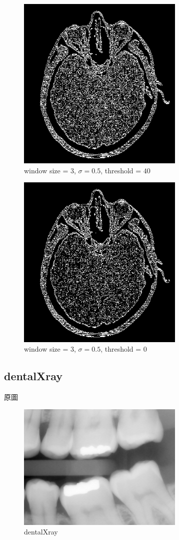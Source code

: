 \documentclass[conference]{IEEEtran}
\begin{document}
\begin{figure}[H]
\centerline{\includegraphics[width=8cm]{headCT13.png}}
\caption{window size = $3$, $\sigma=0.5$,  threshold = $40$}
\label{headCT13}
\end{figure}

\begin{figure}[H]
\centerline{\includegraphics[width=8cm]{headCT14.png}}
\caption{window size = $3$, $\sigma=0.5$,  threshold = $0$}
\label{headCT14}
\end{figure}

\subsection{dentalXray}

原圖

\begin{figure}[H]
\centerline{\includegraphics[width=8cm]{dentalXray.png}}
\caption{dentalXray}
\label{dentalXray}
\end{figure}
\end{document}
